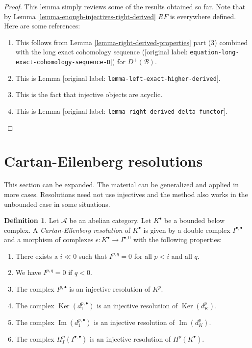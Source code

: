 \documentclass[10pt,a4paper]{article}
\theoremstyle{plain}
\theoremstyle{definition}
\newtheorem{definition}[subsection]{Definition}
\theoremstyle{remark}
\numberwithin{equation}{subsection}
\def\Ker{\mathop{\mathrm{Ker}}}
\def\Im{\mathop{\mathrm{Im}}}
\begin{document}
\begin{proof}
This lemma simply reviews some of the results obtained so far.
Note that by
Lemma \ref{lemma-enough-injectives-right-derived}
$RF$ is everywhere defined. Here are some references:
\begin{enumerate}
\item This follows from
Lemma \ref{lemma-right-derived-properties} part (3)
combined with the long exact cohomology sequence
([original label: \nolinkurl{equation-long-exact-cohomology-sequence-D}]) for
$D^{+}(\mathcal{B})$.
\item This is
Lemma [original label: \nolinkurl{lemma-left-exact-higher-derived}].
\item This is the fact that injective objects are acyclic.
\item This is
Lemma [original label: \nolinkurl{lemma-right-derived-delta-functor}].
\end{enumerate}
\end{proof}







\section{Cartan-Eilenberg resolutions}
\label{section-cartan-eilenberg}

\noindent
This section can be expanded. The material can be generalized and applied in
more cases. Resolutions need not use injectives and the method also
works in the unbounded case in some situations.

\begin{definition}
\label{definition-cartan-eilenberg}
Let $\mathcal{A}$ be an abelian category.
Let $K^\bullet$ be a bounded below complex.
A {\it Cartan-Eilenberg resolution} of $K^\bullet$
is given by a double complex $I^{\bullet, \bullet}$
and a morphism of complexes $\epsilon : K^\bullet \to I^{\bullet, 0}$
with the following properties:
\begin{enumerate}
\item There exists a $i \ll 0$ such that $I^{p, q} = 0$ for all $p < i$
and all $q$.
\item We have $I^{p, q} = 0$ if $q < 0$.
\item The complex $I^{p, \bullet}$ is an injective resolution of $K^p$.
\item The complex $\Ker(d_1^{p, \bullet})$ is an injective resolution
of $\Ker(d_K^p)$.
\item The complex $\Im(d_1^{p, \bullet})$ is an injective resolution
of $\Im(d_K^p)$.
\item The complex $H^p_I(I^{\bullet, \bullet})$ is an injective resolution
of $H^p(K^\bullet)$.
\end{enumerate}
\end{definition}
\end{document}
